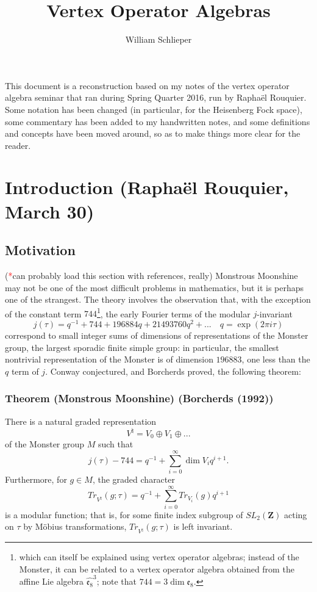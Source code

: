 \documentclass{article}
\author{William Schlieper}
\title{Vertex Operator Algebras}
\newcommand{\ZZ}{\mathbold{Z}}
\newcommand{\tk}{\textcolor{red}{*}}
\begin{document}
\maketitle
This document is a reconstruction based on my notes of the vertex operator algebra seminar that ran during Spring Quarter 2016, run by Raphaël Rouquier.  Some notation has been changed (in particular, for the Heisenberg Fock space), some commentary has been added to my handwritten notes, and some definitions and concepts have been moved around, so as to make things more clear for the reader.

\tableofcontents

\section{Introduction (Raphaël Rouquier, March 30)}
\label{sec:intro}

\subsection{Motivation}
\label{sec:mot}
(\tk can probably load this section with references, really)
\nocite{MR1651389,MR996026,MR2058353,MR2891861}
Monstrous Moonshine may not be one of the most difficult problems in mathematics, but it is perhaps one of the strangest.  The theory involves the observation that, with the exception of the constant term $744$\footnote{which can itself be explained using vertex operator algebras; instead of the Monster, it can be related to a vertex operator algebra obtained from the affine Lie algebra $\widehat{\mathfrak{e}_8}^3$; note that $744=3 \dim \mathfrak{e}_8$.}, the early Fourier terms of the modular $j$-invariant
\[j(\tau)=q^{-1}+744+196884q+21493760q^2+... \quad q=\exp(2 \pi i \tau)\]
correspond to small integer sums of dimensions of representations of the Monster group, the largest sporadic finite simple group: in particular, the smallest nontrivial representation of the Monster is of dimension $196883$, one less than the $q$ term of $j$.  Conway conjectured, and Borcherds proved, the following theorem:
\subsubsection{Theorem (Monstrous Moonshine) (Borcherds (1992)) \cite{MR1172696}}
\label{sec:monmoon}
There is a natural graded representation
\[V^\natural = V_0 \oplus V_1 \oplus ... \]
of the Monster group $M$ such that
\[j(\tau)-744=q^{-1}+\sum_{i=0}^{\infty} \dim V_i q^{i+1}. \]
Furthermore, for $g \in M$, the graded character
\[Tr_{V^\natural}(g;\tau)=q^{-1}+\sum_{i=0}^{\infty} Tr_{V_i}(g) q^{i+1} \]
is a modular function; that is, for some finite index subgroup of $SL_2(\ZZ)$ acting on $\tau$ by Möbius transformations, $Tr_{V^\natural}(g;\tau)$ is left invariant.
\end{document}
